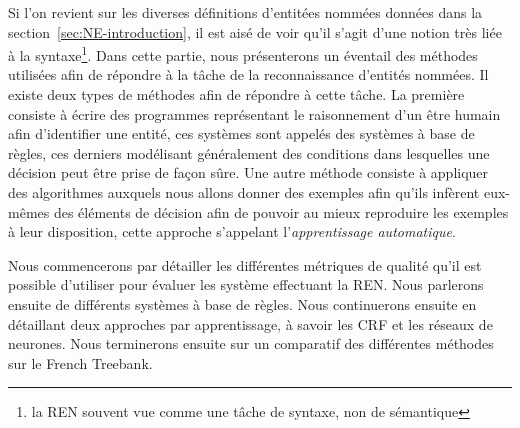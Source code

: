 \documentclass[PhD-Yoann-Dupont.tex]{subfiles}
\begin{document}
Si l'on revient sur les diverses définitions d'entitées nommées données dans la section\ \ref{sec:NE-introduction}, il est aisé de voir qu'il s'agit d'une notion très liée à la syntaxe\footnote{la REN souvent vue comme une tâche de syntaxe, non de sémantique}. Dans cette partie, nous présenterons un éventail des méthodes utilisées afin de répondre à la tâche de la reconnaissance d'entités nommées. Il existe deux types de méthodes afin de répondre à cette tâche. La première consiste à écrire des programmes représentant le raisonnement d'un être humain afin d'identifier une entité, ces systèmes sont appelés des systèmes à base de règles, ces derniers modélisant généralement des conditions dans lesquelles une décision peut être prise de façon sûre. Une autre méthode consiste à appliquer des algorithmes auxquels nous allons donner des exemples afin qu'ils infèrent eux-mêmes des éléments de décision afin de pouvoir au mieux reproduire les exemples à leur disposition, cette approche s'appelant l'\emph{apprentissage automatique}.

Nous commencerons par détailler les différentes métriques de qualité qu'il est possible d'utiliser pour évaluer les système effectuant la REN. Nous parlerons ensuite de différents systèmes à base de règles. Nous continuerons ensuite en détaillant deux approches par apprentissage, à savoir les CRF et les réseaux de neurones. Nous terminerons ensuite sur un comparatif des différentes méthodes sur le French Treebank.
\end{document}
